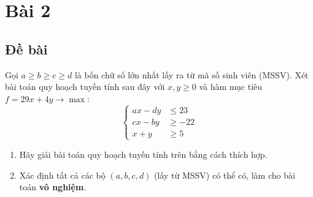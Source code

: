 \documentclass[12pt]{article}
\begin{document}
\section{Bài 2}
\subsection{Đề bài}
Gọi $a \geq b \geq c \geq d$ là bốn chữ số lớn nhất lấy ra từ mã số sinh viên (MSSV). Xét bài toán quy hoạch tuyến tính sau đây với $x, y \geq 0$ và hàm mục tiêu $f = 29x + 4y \rightarrow \max$:
\begin{equation}
\left\{ 
\begin{aligned}
ax - dy &\leq 23 \\
cx - by &\geq -22 \\
x + y &\geq 5
\end{aligned}
\right.
\end{equation}
\begin{enumerate}[label=(\alph*)]
\item Hãy giải bài toán quy hoạch tuyến tính trên bằng cách thích hợp.
\item Xác định tất cả các bộ $(a, b, c, d)$ (lấy từ MSSV) có thể có, làm cho bài toán \textbf{vô nghiệm}.
\end{enumerate}
\end{document}
